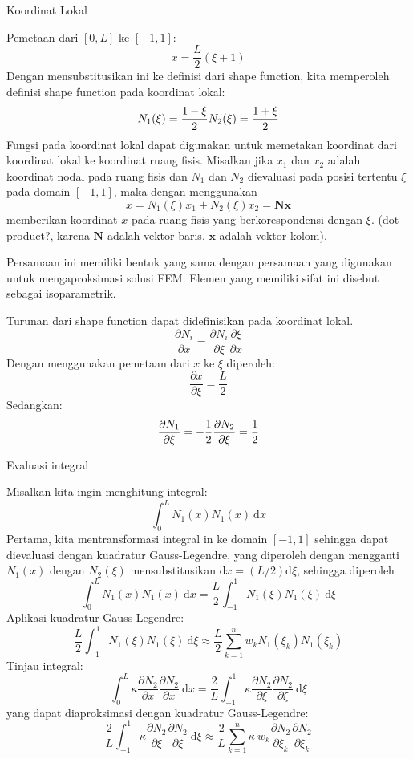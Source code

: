 Koordinat Lokal

Pemetaan dari $[0,L]$ ke $[-1,1]$:
$$
x = \frac{L}{2}(\xi + 1)
$$
Dengan mensubstitusikan ini ke definisi dari shape function, kita memperoleh definisi shape function pada koordinat lokal:
$$
N_1(\xi) = \frac{1 - \xi}{2} \\
N_2(\xi) = \frac{1 + \xi}{2}
$$
Fungsi pada koordinat lokal dapat digunakan untuk memetakan koordinat dari koordinat lokal ke koordinat ruang fisis. Misalkan jika $x_1$ dan $x_2$ adalah koordinat nodal pada ruang fisis dan $N_1$ dan $N_2$ dievaluasi pada posisi tertentu $\xi$ pada domain $[-1,1]$, maka dengan menggunakan
$$
x = N_1(\xi) x_1 + N_2(\xi) x_{2} = \mathbf{N}\mathbf{x}
$$
memberikan koordinat $x$ pada ruang fisis yang berkorespondensi dengan $\xi$. (dot product?, karena $\mathbf{N}$ adalah vektor baris, $\mathbf{x}$ adalah vektor kolom).

Persamaan ini memiliki bentuk yang sama dengan persamaan yang digunakan untuk mengaproksimasi solusi FEM. Elemen yang memiliki sifat ini disebut sebagai isoparametrik.

Turunan dari shape function dapat didefinisikan pada koordinat lokal.
$$
\frac{\partial N_i}{\partial x} =
\frac{\partial N_i}{\partial \xi}
\frac{\partial \xi}{\partial x}
$$
Dengan menggunakan pemetaan dari $x$ ke $\xi$ diperoleh:
$$
\frac{\partial x}{\partial \xi} = \frac{L}{2}
$$
 Sedangkan:
$$
\frac{\partial N_1}{\partial \xi} = -\frac{1}{2} \\
\frac{\partial N_2}{\partial \xi} = \frac{1}{2}
$$

Evaluasi integral

Misalkan kita ingin menghitung integral:
$$
\int_{0}^{L} N_{1}(x) N_{1}(x)\ \mathrm{d}x
$$
Pertama, kita mentransformasi integral in ke domain $[-1,1]$ sehingga dapat dievaluasi dengan kuadratur Gauss-Legendre, yang diperoleh dengan mengganti $N_1(x)$ dengan $N_{2}(\xi)$ mensubstitusikan $\mathrm{d}x = (L/2)\mathrm{d}\xi$, sehingga diperoleh
$$
\int_{0}^{L} N_{1}(x) N_{1}(x)\ \mathrm{d}x = \frac{L}{2}
\int_{-1}^{1} N_{1}(\xi) N_{1}(\xi)\ \mathrm{d}\xi
$$
Aplikasi kuadratur Gauss-Legendre:
$$
\frac{L}{2}
\int_{-1}^{1} N_{1}(\xi) N_{1}(\xi)\ \mathrm{d}\xi \approx
\frac{L}{2} \sum_{k=1}^{n} w_{k} N_{1}(\xi_{k}) N_{1}(\xi_{k})
$$
Tinjau integral:
$$
\int_{0}^{L} \kappa \frac{\partial N_2}{\partial x}
\frac{\partial N_2}{\partial x} \ \mathrm{d}x =
\frac{2}{L} \int_{-1}^{1} \kappa \frac{\partial N_2}{\partial \xi}
\frac{\partial N_2}{\partial \xi} \ \mathrm{d}\xi
$$
yang dapat diaproksimasi dengan kuadratur Gauss-Legendre:
$$
\frac{2}{L} \int_{-1}^{1} \kappa \frac{\partial N_2}{\partial \xi}
\frac{\partial N_2}{\partial \xi} \ \mathrm{d}\xi \approx
\frac{2}{L} \sum_{k=1}^{n} \kappa \ w_{k}
\frac{\partial N_2}{\partial \xi_{k}}
\frac{\partial N_2}{\partial \xi_{k}}
$$

